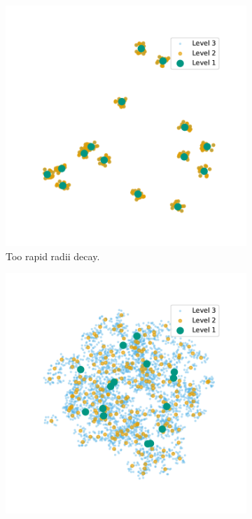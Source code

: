 \begin{figure}[tbhp]
	\begin{subfigure}[t]{0.3\linewidth}
		\centering
		\includegraphics[width=\linewidth]{graphics/small.pdf}
		\caption{Too rapid radii decay.}
		\label{fig:radius_small}
	\end{subfigure}
	\hfill
	\begin{subfigure}[t]{0.3\linewidth}
		\centering
		\includegraphics[width=\linewidth]{graphics/good.pdf}

\end{subfigure}
\end{figure}
